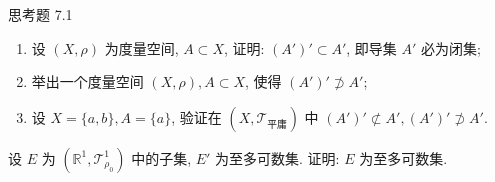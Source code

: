 \begin{exblock}{思考题 7.1}
  \item \begin{enumerate}
    \item 设 $(X, \rho)$ 为度量空间, $A \subset X$, 证明: $(A')' \subset A'$, 即导集 $A'$ 必为闭集;
    \item 举出一个度量空间 $(X, \rho), A \subset X$, 使得 $(A')' \not\supset A'$;
    \item 设 $X = \{a, b\}, A = \{a\}$, 验证在 $(X, \mathcal{T}_{\text{平庸}})$ 中 $(A')' \not\subset A', (A')' \not\supset A'$.
  \end{enumerate}
  \item 设 $E$ 为 $(\mathbb{R}^1, \mathcal{T}_{\rho_0}^1)$ 中的子集, $E'$ 为至多可数集. 证明: $E$ 为至多可数集.
\end{exblock}
